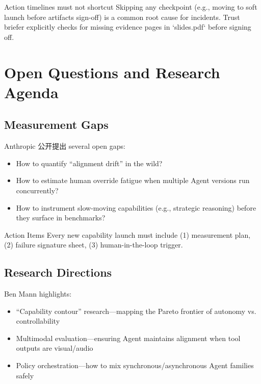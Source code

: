 \documentclass[a4paper]{article}
\begin{document}
\begin{warningbox}{Action timelines must not shortcut}
Skipping any checkpoint (e.g., moving to soft launch before artifacts sign-off) is a common root cause for incidents. Trust briefer explicitly checks for missing evidence pages in `slides.pdf` before signing off.
\end{warningbox}

\section{Open Questions and Research Agenda}

\subsection{Measurement Gaps}

Anthropic 公开提出 several open gaps:

\begin{itemize}
    \item How to quantify ``alignment drift'' in the wild?
    \item How to estimate human override fatigue when multiple Agent versions run concurrently?
    \item How to instrument slow-moving capabilities (e.g., strategic reasoning) before they surface in benchmarks?
\end{itemize}

\begin{knowledgebox}{Action Items}
Every new capability launch must include (1) measurement plan, (2) failure signature sheet, (3) human-in-the-loop trigger.
\end{knowledgebox}

\subsection{Research Directions}

Ben Mann highlights:

\begin{itemize}
    \item ``Capability contour'' research—mapping the Pareto frontier of autonomy vs. controllability
    \item Multimodal evaluation—ensuring Agent maintains alignment when tool outputs are visual/audio
    \item Policy orchestration—how to mix synchronous/asynchronous Agent families safely
\end{itemize}
\end{document}
